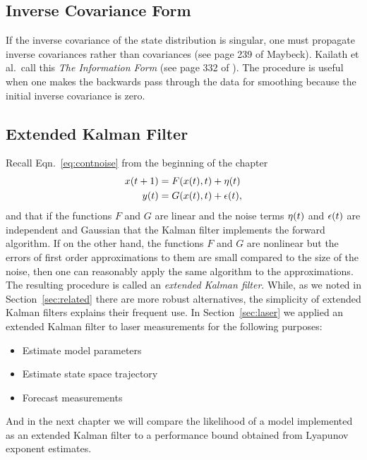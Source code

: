 \subsection{Inverse Covariance Form}
\label{sec:DetailInverse}

 If the inverse covariance of the state distribution is singular, one
 must propagate inverse covariances rather than covariances (see page
 239 of Maybeck\cite{Maybeck79}).  Kailath et al.\ call this \emph{The
   Information Form} (see page 332 of \cite{KSH00}).
  The procedure is useful when one makes the
 backwards pass through the data for smoothing because the initial
 inverse covariance is zero.

\subsection{Extended Kalman Filter}
\label{sec:EKF}

Recall Eqn.~\eqref{eq:contnoise} from the beginning of the chapter
\begin{align*}
  {x}{(t+1)} &= F({x}{(t)},t) + {\eta}{(t)}\\
  {y}{(t)}   &= G({x}{(t)},t) + {\epsilon}{(t)},
\end{align*}
and that if the functions $F$ and $G$ are linear and the noise terms
${\eta}{(t)}$ and ${\epsilon}{(t)}$ are independent and Gaussian
that the Kalman filter implements the forward algorithm.  If on the
other hand, the functions $F$ and $G$ are nonlinear but the errors of
first order approximations to them are small compared to the size of
the noise, then one can reasonably apply the same algorithm to the
approximations.  The resulting procedure is called an \emph{extended
  Kalman filter}.  While, as we noted in Section~\ref{sec:related}
there are more robust alternatives, the simplicity of extended Kalman
filters explains their frequent use.  In Section~\ref{sec:laser} we
applied an extended Kalman filter to laser measurements for the
following purposes:
\begin{itemize}
\item Estimate model parameters
\item Estimate state space trajectory
\item Forecast measurements
\end{itemize}
And in the next chapter we will compare the likelihood of a model
implemented as an extended Kalman filter to a performance bound
obtained from Lyapunov exponent estimates.

